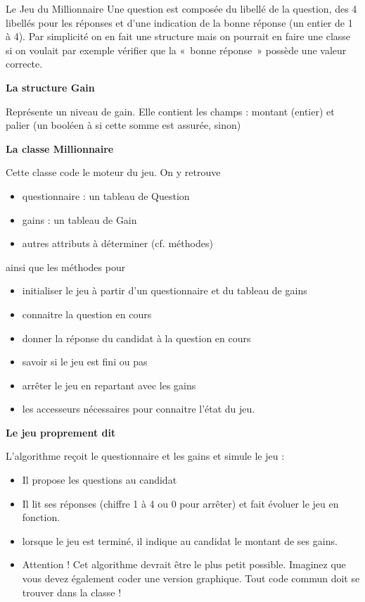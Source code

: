 \begin{Exercice}{Le Jeu du Millionnaire}
	Une question est composée du libellé de la question, des 4 libellés pour
	les réponses et d’une indication de la bonne réponse (un entier de 1 à
	4). Par simplicité on en fait une structure mais on pourrait en faire
	une classe si on voulait par exemple vérifier que la «~bonne réponse~»
	possède une valeur correcte.

	{\bfseries La structure Gain}

	Représente un niveau de gain. Elle contient les champs :
	montant (entier) et palier (un booléen à
	 si cette somme est
	assurée,  sinon)

	{\bfseries La classe Millionnaire}

	Cette classe code le moteur du jeu. On y retrouve

	\begin{itemize}
		\item 
			questionnaire : un tableau de Question
		\item 
			gains : un tableau de Gain
		\item 
			autres attributs à déterminer (cf. méthodes)
	\end{itemize}
	
	ainsi que les méthodes pour

	\begin{itemize}
		\item 
			initialiser le jeu à partir d’un questionnaire
			et du tableau de gains
		\item 
			connaitre la question en cours
		\item 
			donner la réponse du candidat à la question en
			cours
		\item 
			savoir si le jeu est fini ou pas
		\item 
			arrêter le jeu en repartant avec les gains
		\item 
			les accesseurs nécessaires pour connaitre
			l’état du jeu.
	\end{itemize}
	
	{\bfseries
	Le jeu proprement dit}

	L'algorithme  reçoit le
	questionnaire et les gains et simule le jeu :

	\begin{itemize}
	\item 
		Il propose les questions au candidat
	\item 
		Il lit ses réponses (chiffre 1 à 4 ou 0 pour
		arrêter) et fait évoluer le jeu en fonction.
	\item 
		lorsque le jeu est terminé, il indique au
		candidat le montant de ses gains.
	\item 
		Attention ! Cet algorithme devrait être le plus
		petit possible. Imaginez que vous devez également coder une version
		graphique. Tout code commun doit se trouver dans la classe
	!
	\end{itemize}
\end{Exercice}

